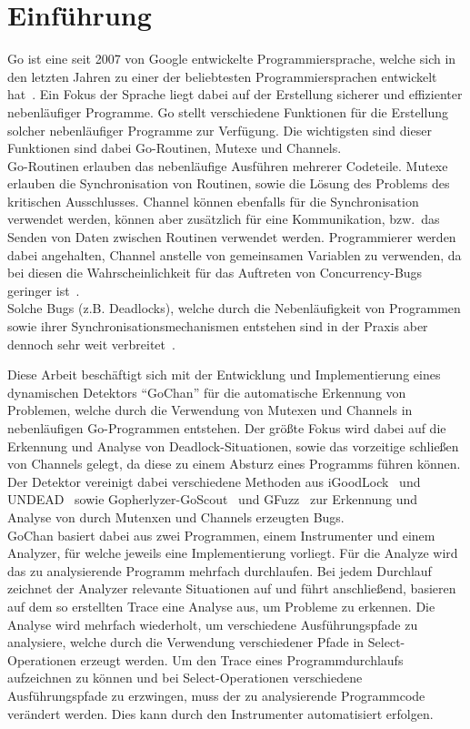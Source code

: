 \chapter{Einführung}\label{chap:introduction}
Go ist eine seit 2007 von Google entwickelte Programmiersprache, welche sich 
in den letzten Jahren zu einer der beliebtesten Programmiersprachen entwickelt 
hat~\cite{ranking}. Ein Fokus der Sprache liegt dabei auf der Erstellung
sicherer und effizienter nebenläufiger Programme. Go stellt verschiedene 
Funktionen für die Erstellung solcher nebenläufiger Programme zur Verfügung.
Die wichtigsten sind dieser Funktionen sind dabei Go-Routinen, Mutexe und 
Channels.\\Go-Routinen erlauben das nebenläufige Ausführen mehrerer Codeteile.
Mutexe erlauben die Synchronisation von Routinen, sowie die Lösung des Problems 
des kritischen Ausschlusses. 
Channel können ebenfalls für die Synchronisation verwendet werden,
können aber zusätzlich für eine Kommunikation, bzw.\ das Senden von Daten zwischen 
Routinen verwendet werden. Programmierer werden dabei angehalten, Channel
anstelle von gemeinsamen Variablen zu verwenden, da bei diesen die Wahrscheinlichkeit
für das Auftreten von Concurrency-Bugs geringer ist~\cite{sharedMemory}.\\
Solche Bugs (z.B. Deadlocks), welche durch die Nebenläufigkeit von Programmen sowie ihrer 
Synchronisationsmechanismen entstehen sind in der Praxis aber dennoch sehr weit 
verbreitet~\cite{numberBugs}.

Diese Arbeit beschäftigt sich mit der Entwicklung und Implementierung
eines dynamischen Detektors ``GoChan'' für die automatische Erkennung
von Problemen, welche durch die Verwendung von Mutexen und Channels 
in nebenläufigen Go-Programmen entstehen. Der größte Fokus wird dabei 
auf die Erkennung und Analyse von Deadlock-Situationen, sowie das vorzeitige 
schließen von Channels gelegt, da diese zu einem Absturz eines Programms 
führen können. Der Detektor vereinigt dabei verschiedene Methoden aus 
iGoodLock~\cite{iGoodLock} und UNDEAD~\cite{Undead} sowie 
Gopherlyzer-GoScout~\cite{PPDP18} und GFuzz~\cite{gfuzz} zur 
Erkennung und Analyse von 
durch Mutenxen und Channels erzeugten Bugs.\\
GoChan basiert dabei aus zwei Programmen, einem Instrumenter und einem 
Analyzer, für welche jeweils eine 
Implementierung vorliegt. Für die Analyze wird das zu analysierende Programm 
mehrfach durchlaufen. Bei jedem Durchlauf zeichnet der Analyzer relevante 
Situationen auf und führt anschließend, basieren auf dem so erstellten Trace 
eine Analyse aus, um Probleme zu erkennen. Die Analyse wird mehrfach wiederholt, 
um verschiedene Ausführungspfade zu analysiere, welche durch die Verwendung 
verschiedener Pfade in Select-Operationen erzeugt werden. Um den Trace eines 
Programmdurchlaufs aufzeichnen zu können und bei Select-Operationen verschiedene 
Ausführungspfade zu erzwingen, muss der zu analysierende Programmcode 
verändert werden. Dies kann durch den Instrumenter automatisiert erfolgen.

